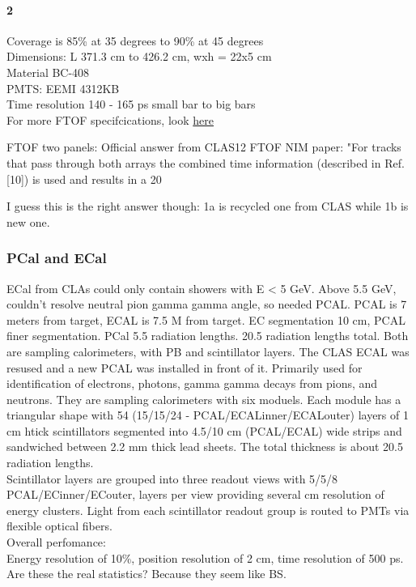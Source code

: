             \paragraph{2}
                Coverage is 85\% at 35 degrees to 90\% at 45 degrees\\
                Dimensions: L 371.3 cm to 426.2 cm, wxh = 22x5 cm\\
                Material BC-408\\
                PMTS: EEMI 4312KB\\
                Time resolution 140 - 165 ps small bar to big bars\\
           
           
            For more FTOF specifcications, look \href{https://www.jlab.org/Hall-B/ftof/notes/ftof_geom.pdf}{here} 
                
            FTOF two panels:
Official answer from CLAS12 FTOF NIM paper:
"For tracks that pass through both arrays the combined time information (described in Ref. [10]) is used and results in a 20%

I guess this is the right answer though:
1a is recycled one from CLAS while 1b is new one.
            
            
        \subsubsection{PCal and ECal}
            ECal from CLAs could only contain showers with E < 5 GeV. Above 5.5 GeV, couldn't resolve neutral pion gamma gamma angle, so needed PCAL. PCAL is 7 meters from target, ECAL is 7.5 M from target. EC segmentation 10 cm, PCAL finer segmentation. PCal 5.5 radiation lengths. 20.5 radiation lengths total. Both are sampling calorimeters, with PB and scintillator layers. The CLAS ECAL was resused and a new PCAL was installed in front of it. Primarily used for identification of electrons, photons, gamma gamma decays from pions, and neutrons. They are sampling calorimeters with six moduels. Each module has a triangular shape with 54 (15/15/24 - PCAL/ECALinner/ECALouter) layers of 1 cm htick scintillators segmented into 4.5/10 cm (PCAL/ECAL) wide strips and sandwiched between 2.2 mm thick lead sheets. The total thickness is about 20.5 radiation lengths. \\
            \indent Scintillator layers are grouped into three readout views with 5/5/8 PCAL/ECinner/ECouter, layers per view providing several cm resolution of energy clusters. Light from each scintillator readout group is routed to PMTs via flexible optical fibers.\\
            Overall perfomance:\\
            Energy resolution of 10\%, position resolution of 2 cm, time resolution of 500 ps. \\
            Are these the real statistics? Because they seem like BS.
            
